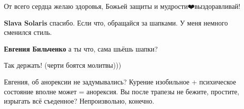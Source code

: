 \begin{itemize}
 
От всего сердца желаю здоровья, Божьей защиты и мудрости❤️выздоравливай!

\begin{itemize}
 
\textbf{Slava Solaris} спасибо. Если что, обращайся за шапками. У меня немного сменился стиль.

 
\textbf{Евгения Бильченко} а ты что, сама шьёшь шапки?
\end{itemize}

 
Так держать!
(черти боятся молитвы)))

 

Евгения, об анорексии не задумывались? Курение изобильное + психическое
состояние вполне может = анорексия. Вы после трапезы не бежите, простите,
изрыгать всё съеденное? Непроизвольно, конечно.

\begin{itemize}
 

\end{itemize}
\end{itemize}
